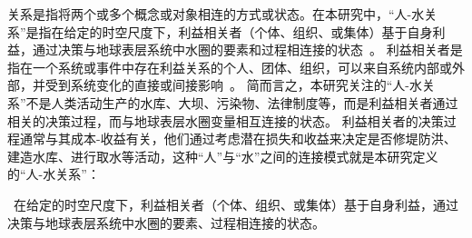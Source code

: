 关系是指将两个或多个概念或对象相连的方式或状态。在本研究中，“人-水关系”是指在给定的时空尺度下，利益相关者（个体、组织、或集体）基于自身利益，通过决策与地球表层系统中水圈的要素和过程相连接的状态~\cite{bonnafous-boucher2016}。
利益相关者是指在一个系统或事件中存在利益关系的个人、团体、组织，可以来自系统内部或外部，并受到系统变化的直接或间接影响~\cite{bonnafous-boucher2016}。
简而言之，本研究关注的“人-水关系”不是人类活动生产的水库、大坝、污染物、法律制度等，而是利益相关者通过相关的决策过程，而与地球表层水圈变量相互连接的状态。
利益相关者的决策过程通常与其成本-收益有关，他们通过考虑潜在损失和收益来决定是否修堤防洪、建造水库、进行取水等活动，这种“人”与“水”之间的连接模式就是本研究定义的“人-水关系”：

{\kai~在给定的时空尺度下，利益相关者（个体、组织、或集体）基于自身利益，通过决策与地球表层系统中水圈的要素、过程相连接的状态。}

